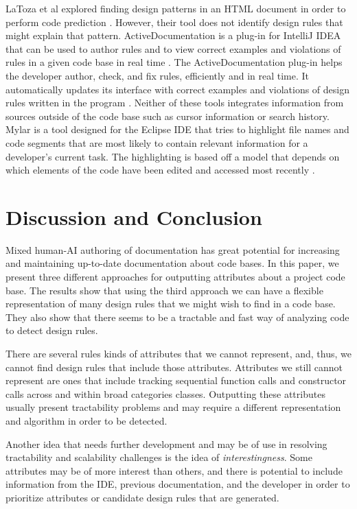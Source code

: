 \documentclass[12pt]{article}
\begin{document}
LaToza et al explored finding design patterns in an HTML document in order to perform code prediction \cite{LaTozaEtAl2019}. However, their tool does not identify design rules that might explain that pattern. 
ActiveDocumentation is a plug-in for IntelliJ IDEA that can be used to author rules and to view correct examples and violations of rules in a given code base in real time \cite{MehrpurEtAl2019}. The ActiveDocumentation plug-in helps the developer author, check, and fix rules, efficiently and in real time. It automatically updates its interface with correct examples and violations of design rules written in the program \cite{MehrpurEtAl2019}. Neither of these tools integrates information from sources outside of the code base such as cursor information or search history. Mylar is a tool designed for the Eclipse IDE that tries to highlight file names and code segments that are most likely to contain relevant information for a developer's current task. The highlighting is based off a model that depends on which elements of the code have been edited and accessed most recently \cite{KerstenMurphy2005}.




\clearpage


\section{Discussion and Conclusion}\label{disc}

Mixed human-AI authoring of documentation has great potential for increasing and maintaining up-to-date documentation about code bases. In this paper, we present three different approaches for outputting attributes about a project code base. The results show that using the third approach we can have a flexible representation of  many design rules that we might wish to find in a code base. They also show that there seems to be a tractable and fast way of analyzing code to detect design rules.

There are several rules kinds of attributes that we cannot represent, and, thus, we cannot find design rules that include those attributes. Attributes we still cannot represent are ones that include tracking sequential function calls and constructor calls across and within broad categories classes. Outputting these attributes usually present tractability problems and may require a different representation and algorithm in order to be detected.

Another idea that needs further development and may be of use in resolving tractability and scalability challenges is the idea of \textit{interestingness}. Some attributes may be of more interest than others, and there is potential to include information from the IDE, previous documentation, and the developer in order to prioritize attributes or candidate design rules that are generated.
\end{document}
